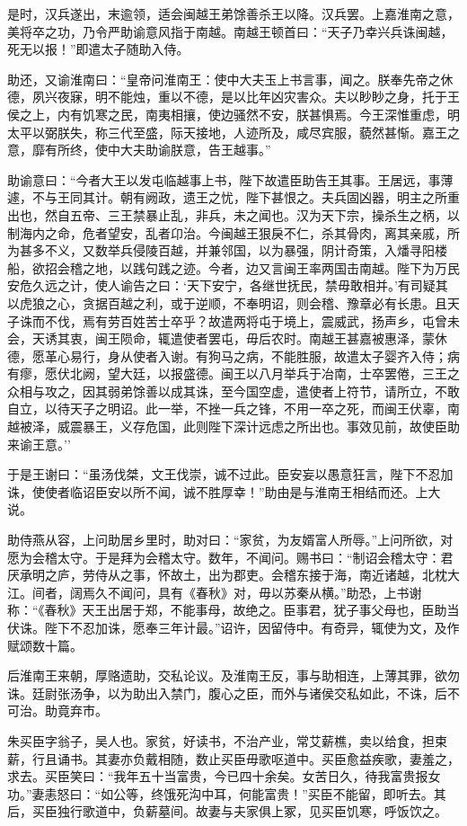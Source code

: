 \documentclass[]{article}
\begin{document}
是时，汉兵遂出，末逾领，适会闽越王弟馀善杀王以降。汉兵罢。上嘉淮南之意，美将卒之功，乃令严助谕意风指于南越。南越王顿首曰：``天子乃幸兴兵诛闽越，死无以报！''即遣太子随助入侍。

助还，又谕淮南曰：``皇帝问淮南王：使中大夫玉上书言事，闻之。朕奉先帝之休德，夙兴夜寐，明不能烛，重以不德，是以比年凶灾害众。夫以眇眇之身，托于王侯之上，内有饥寒之民，南夷相攘，使边骚然不安，朕甚惧焉。今王深惟重虑，明太平以弼朕失，称三代至盛，际天接地，人迹所及，咸尽宾服，藐然甚惭。嘉王之意，靡有所终，使中大夫助谕朕意，告王越事。''

助谕意曰：``今者大王以发屯临越事上书，陛下故遣臣助告王其事。王居远，事薄遽，不与王同其计。朝有阙政，遗王之忧，陛下甚恨之。夫兵固凶器，明主之所重出也，然自五帝、三王禁暴止乱，非兵，未之闻也。汉为天下宗，操杀生之柄，以制海内之命，危者望安，乱者卬治。今闽越王狠戾不仁，杀其骨肉，离其亲戚，所为甚多不义，又数举兵侵陵百越，并兼邻国，以为暴强，阴计奇策，入燔寻阳楼船，欲招会稽之地，以践句践之迹。今者，边又言闽王率两国击南越。陛下为万民安危久远之计，使人谕告之曰：`天下安宁，各继世抚民，禁毋敢相并。'有司疑其以虎狼之心，贪据百越之利，或于逆顺，不奉明诏，则会稽、豫章必有长患。且天子诛而不伐，焉有劳百姓苦士卒乎？故遣两将屯于境上，震威武，扬声乡，屯曾未会，天诱其衷，闽王陨命，辄遣使者罢屯，毋后农时。南越王甚嘉被惠泽，蒙休德，愿革心易行，身从使者入谢。有狗马之病，不能胜服，故遣太子婴齐入侍；病有瘳，愿伏北阙，望大廷，以报盛德。闽王以八月举兵于冶南，士卒罢倦，三王之众相与攻之，因其弱弟馀善以成其诛，至今国空虚，遣使者上符节，请所立，不敢自立，以待天子之明诏。此一举，不挫一兵之锋，不用一卒之死，而闽王伏辜，南越被泽，威震暴王，义存危国，此则陛下深计远虑之所出也。事效见前，故使臣助来谕王意。''

于是王谢曰：``虽汤伐桀，文王伐崇，诚不过此。臣安妄以愚意狂言，陛下不忍加诛，使使者临诏臣安以所不闻，诚不胜厚幸！''助由是与淮南王相结而还。上大说。

助侍燕从容，上问助居乡里时，助对曰：``家贫，为友婿富人所辱。''上问所欲，对愿为会稽太守。于是拜为会稽太守。数年，不闻问。赐书曰：``制诏会稽太守：君厌承明之庐，劳侍从之事，怀故土，出为郡吏。会稽东接于海，南近诸越，北枕大江。间者，阔焉久不闻问，具有《春秋》对，毋以苏秦从横。''助恐，上书谢称：``《春秋》天王出居于郑，不能事母，故绝之。臣事君，犹子事父母也，臣助当伏诛。陛下不忍加诛，愿奉三年计最。''诏许，因留侍中。有奇异，辄使为文，及作赋颂数十篇。

后淮南王来朝，厚赂遗助，交私论议。及淮南王反，事与助相连，上薄其罪，欲勿诛。廷尉张汤争，以为助出入禁门，腹心之臣，而外与诸侯交私如此，不诛，后不可治。助竟弃市。

朱买臣字翁子，吴人也。家贫，好读书，不治产业，常艾薪樵，卖以给食，担束薪，行且诵书。其妻亦负戴相随，数止买臣毋歌呕道中。买臣愈益疾歌，妻羞之，求去。买臣笑曰：``我年五十当富贵，今已四十余矣。女苦日久，待我富贵报女功。''妻恚怒曰：``如公等，终饿死沟中耳，何能富贵！''买臣不能留，即听去。其后，买臣独行歌道中，负薪墓间。故妻与夫家俱上冢，见买臣饥寒，呼饭饮之。
\end{document}
